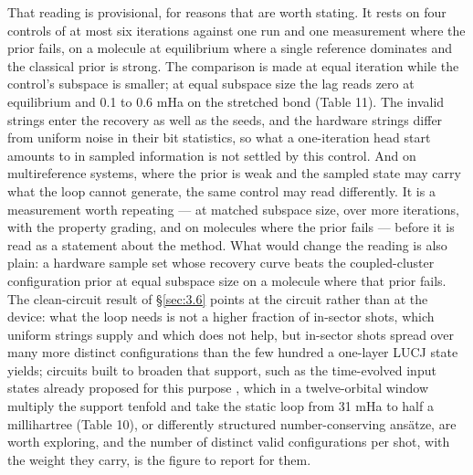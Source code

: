 \documentclass[11pt]{article}
\begin{document}
That reading is provisional, for reasons that are worth stating. It rests on four controls of at most six iterations against one run and one measurement where the prior fails, on a molecule at equilibrium where a single reference dominates and the classical prior is strong. The comparison is made at equal iteration while the control's subspace is smaller; at equal subspace size the lag reads zero at equilibrium and 0.1 to 0.6 mHa on the stretched bond (Table 11). The invalid strings enter the recovery as well as the seeds, and the hardware strings differ from uniform noise in their bit statistics, so what a one-iteration head start amounts to in sampled information is not settled by this control. And on multireference systems, where the prior is weak and the sampled state may carry what the loop cannot generate, the same control may read differently. It is a measurement worth repeating --- at matched subspace size, over more iterations, with the property grading, and on molecules where the prior fails --- before it is read as a statement about the method. What would change the reading is also plain: a hardware sample set whose recovery curve beats the coupled-cluster configuration prior at equal subspace size on a molecule where that prior fails. The clean-circuit result of \S\ref{sec:3.6} points at the circuit rather than at the device: what the loop needs is not a higher fraction of in-sector shots, which uniform strings supply and which does not help, but in-sector shots spread over many more distinct configurations than the few hundred a one-layer LUCJ state yields; circuits built to broaden that support, such as the time-evolved input states already proposed for this purpose \cite{MikkelsenNakagawa2025}, which in a twelve-orbital window multiply the support tenfold and take the static loop from 31 mHa to half a millihartree (Table 10), or differently structured number-conserving ans\"atze, are worth exploring, and the number of distinct valid configurations per shot, with the weight they carry, is the figure to report for them.
\end{document}
